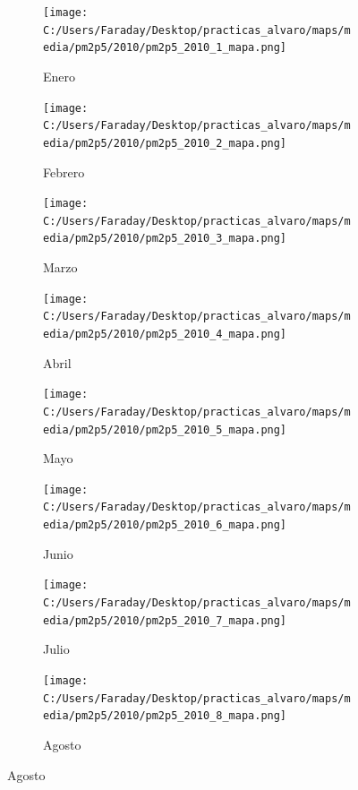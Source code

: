 \documentclass[12pt]{beamer}
\begin{document}
\begin{frame}[squeeze]
\tiny
\begin{figure}[H]
\centering
\begin{subfigure}[H]{0.20\textwidth}
\texttt{[image: C:/Users/Faraday/Desktop/practicas\_alvaro/maps/media/pm2p5/2010/pm2p5\_2010\_1\_mapa.png]}
\captionsetup{labelformat=empty}
\caption{\scriptsize Enero}
\label{fig:map-pm2p5-2010-1}
\end{subfigure}
%
\begin{subfigure}[H]{0.20\textwidth}
\texttt{[image: C:/Users/Faraday/Desktop/practicas\_alvaro/maps/media/pm2p5/2010/pm2p5\_2010\_2\_mapa.png]}
\captionsetup{labelformat=empty}
\caption{\scriptsize Febrero}
\label{fig:map-pm2p5-2010-2}
\end{subfigure}
%
\begin{subfigure}[H]{0.20\textwidth}
\texttt{[image: C:/Users/Faraday/Desktop/practicas\_alvaro/maps/media/pm2p5/2010/pm2p5\_2010\_3\_mapa.png]}
\captionsetup{labelformat=empty}
\caption{\scriptsize Marzo}
\label{fig:map-pm2p5-2010-3}
\end{subfigure}
%
\begin{subfigure}[H]{0.20\textwidth}
\texttt{[image: C:/Users/Faraday/Desktop/practicas\_alvaro/maps/media/pm2p5/2010/pm2p5\_2010\_4\_mapa.png]}
\captionsetup{labelformat=empty}
\caption{\scriptsize Abril}
\label{fig:map-pm2p5-2010-4}
\end{subfigure}

\begin{subfigure}[H]{0.20\textwidth}
\texttt{[image: C:/Users/Faraday/Desktop/practicas\_alvaro/maps/media/pm2p5/2010/pm2p5\_2010\_5\_mapa.png]}
\captionsetup{labelformat=empty}
\caption{\scriptsize Mayo}
\label{fig:map-pm2p5-2010-5}
\end{subfigure}
%
\begin{subfigure}[H]{0.20\textwidth}
\texttt{[image: C:/Users/Faraday/Desktop/practicas\_alvaro/maps/media/pm2p5/2010/pm2p5\_2010\_6\_mapa.png]}
\captionsetup{labelformat=empty}
\caption{\scriptsize Junio}
\label{fig:map-pm2p5-2010-6}
\end{subfigure}
%
\begin{subfigure}[H]{0.20\textwidth}
\texttt{[image: C:/Users/Faraday/Desktop/practicas\_alvaro/maps/media/pm2p5/2010/pm2p5\_2010\_7\_mapa.png]}
\captionsetup{labelformat=empty}
\caption{\scriptsize Julio}
\label{fig:map-pm2p5-2010-7}
\end{subfigure}
%
\begin{subfigure}[H]{0.20\textwidth}
\texttt{[image: C:/Users/Faraday/Desktop/practicas\_alvaro/maps/media/pm2p5/2010/pm2p5\_2010\_8\_mapa.png]}
\captionsetup{labelformat=empty}
\caption{\scriptsize Agosto}
\label{fig:map-pm2p5-2010-8}
\end{subfigure}


\end{figure}
\end{frame}
\end{document}
